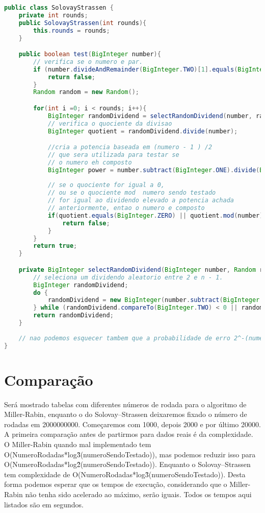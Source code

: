 \documentclass[openany]{ufsctex/ufsctex}
\begin{document}
	 \begin{lstlisting}[language=Java,breaklines=true, tabsize=2,basicstyle =\fontsize{9}{11}]
public class SolovayStrassen {
    private int rounds;
    public SolovayStrassen(int rounds){
        this.rounds = rounds;
    }

    public boolean test(BigInteger number){
        // verifica se o numero e par.
        if (number.divideAndRemainder(BigInteger.TWO)[1].equals(BigInteger.ZERO)) {
            return false;
        }
        Random random = new Random();

        for(int i =0; i < rounds; i++){
            BigInteger randomDividend = selectRandomDividend(number, random);
            // verifica o quociente da divisao
            BigInteger quotient = randomDividend.divide(number);

            //cria a potencia baseada em (numero - 1 ) /2 
            // que sera utilizada para testar se
            // o numero eh composto
            BigInteger power = number.subtract(BigInteger.ONE).divide(BigInteger.TWO);
            
            // se o quociente for igual a 0,
            // ou se o quociente mod  numero sendo testado
            // for igual ao dividendo elevado a potencia achada
            // anteriormente, entao o numero e composto 
            if(quotient.equals(BigInteger.ZERO) || quotient.mod(number).equals(randomDividend.modPow(power, number))){
                return false;
            }
        }
        return true;
    }

    private BigInteger selectRandomDividend(BigInteger number, Random random){
        // seleciona um dividendo aleatorio entre 2 e n - 1.
        BigInteger randomDividend;
        do {
            randomDividend = new BigInteger(number.subtract(BigInteger.ONE).bitLength(), random);
        } while (randomDividend.compareTo(BigInteger.TWO) < 0 || randomDividend.compareTo(number.subtract(BigInteger.ONE)) > 0);
        return randomDividend;
    }
    
    // nao podemos esquecer tambem que a probabilidade de erro 2^-(numero de rodadas)
}
\end{lstlisting}

\section{Comparação}
	Será mostrado tabelas com diferentes números de rodada para o algoritmo de Miller-Rabin, enquanto o do Solovay–Strassen deixaremos fixado o número de rodadas em 2000000000. Começaremos com 1000, depois 2000 e por último 20000. A primeira comparação antes de partirmos para dados reais é da complexidade. O Miller-Rabin quando mal implementado tem O(NumeroRodadas*log\^3(numeroSendoTestado)), mas podemos reduzir isso para O(NumeroRodadas*log\^2(numeroSendoTestado)). Enquanto o Solovay–Strassen tem complexidade de  O(NumeroRodadas*log\^3(numeroSendoTestado)). Desta forma podemos esperar que os tempos de execução, considerando que o Miller-Rabin não tenha sido acelerado ao máximo, serão iguais. Todos os tempos aqui listados são em segundos.
	
\end{document}
